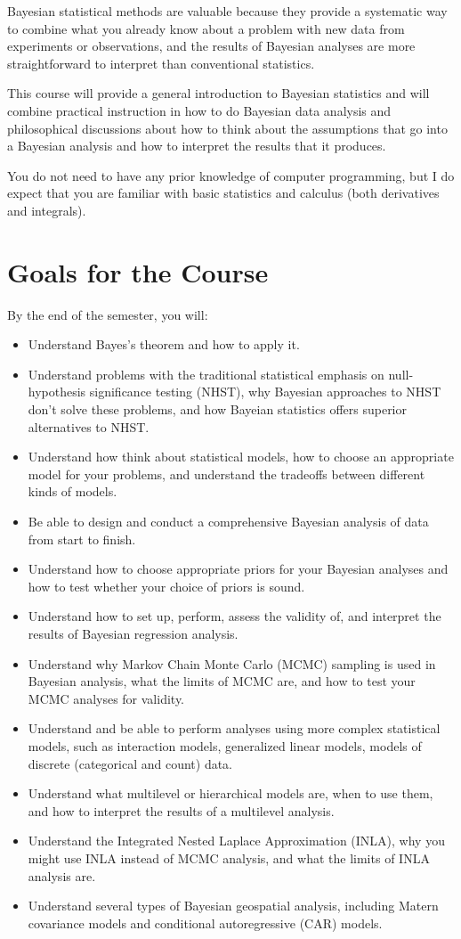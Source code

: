 \documentclass[11pt,twoside]{jgsyllabus}\usepackage[]{graphicx}\usepackage[]{xcolor}
\begin{document}
Bayesian statistical methods are valuable because they provide a systematic
way to combine what you already know about a problem with new data from
experiments or observations, and the results of Bayesian analyses are more
straightforward to interpret than conventional statistics.

This course will provide a general introduction to Bayesian statistics and
will combine practical instruction in how to do Bayesian data analysis and
philosophical discussions about how to think about the assumptions that go into
a Bayesian analysis and how to interpret the results that it produces.

You do not need to have any prior knowledge of computer programming, but I do
expect that you are familiar with basic statistics and calculus
(both derivatives and integrals).


\section[Goals]{Goals for the Course}
By the end of the semester, you will:
\begin{itemize}
\item Understand Bayes's theorem and how to apply it.
\item Understand problems with the traditional statistical emphasis on
  null-hypothesis significance testing (NHST), why Bayesian approaches to
  NHST don't solve these problems, and how Bayeian statistics offers
  superior alternatives to NHST.
\item Understand how think about statistical models, how to choose an
  appropriate model for your problems, and understand the tradeoffs between
  different kinds of models.
\item Be able to design and conduct a comprehensive Bayesian analysis of data
  from start to finish.
\item Understand how to choose appropriate priors for your Bayesian analyses
  and how to test whether your choice of priors is sound.
\item Understand how to set up, perform, assess the validity of, and
  interpret the results of Bayesian regression analysis.
\item Understand why Markov Chain Monte Carlo (MCMC) sampling is used in Bayesian
  analysis, what the limits of MCMC are, and how to test your MCMC analyses
  for validity.
\item Understand and be able to perform analyses using more complex
  statistical models, such as interaction models, generalized linear models,
  models of discrete (categorical and count) data.
\item Understand what multilevel or hierarchical models are, when to use them,
  and how to interpret the results of a multilevel analysis.
\item Understand the Integrated Nested Laplace Approximation (INLA),
  why you might use INLA instead of MCMC analysis, and what the limits of INLA
  analysis are.
\item Understand several types of Bayesian geospatial analysis, including
  Matern covariance models and conditional autoregressive (CAR) models.
\end{itemize}
\end{document}
